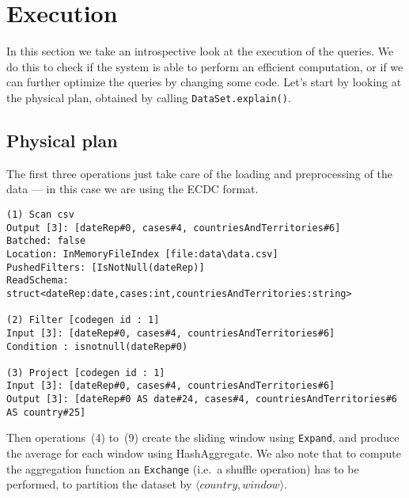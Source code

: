 \section{Execution}
\label{sec:execution}

In this section we take an introspective look at the execution of the queries.
We do this to check if the system is able to perform an efficient computation, or if we can further optimize the queries by changing some code.
Let's start by looking at the physical plan, obtained by calling \texttt{DataSet.explain()}.

\subsection{Physical plan}

The first three operations just take care of the loading and preprocessing of the data — in this case we are using the ECDC format.

\begin{lstlisting}[style=sparkplan]
(1) Scan csv 
Output [3]: [dateRep#0, cases#4, countriesAndTerritories#6]
Batched: false
Location: InMemoryFileIndex [file:data\data.csv]
PushedFilters: [IsNotNull(dateRep)]
ReadSchema: struct<dateRep:date,cases:int,countriesAndTerritories:string>

(2) Filter [codegen id : 1]
Input [3]: [dateRep#0, cases#4, countriesAndTerritories#6]
Condition : isnotnull(dateRep#0)

(3) Project [codegen id : 1]
Input [3]: [dateRep#0, cases#4, countriesAndTerritories#6]
Output [3]: [dateRep#0 AS date#24, cases#4, countriesAndTerritories#6 AS country#25]
\end{lstlisting}

\noindent
Then operations~(4) to~(9) create the sliding window using \texttt{Expand}, and produce the average for each window using HashAggregate. We also note that to compute the aggregation function an \texttt{Exchange} (i.e.\ a shuffle operation) has to be performed, to partition the dataset by $\langle country, window\rangle$.

